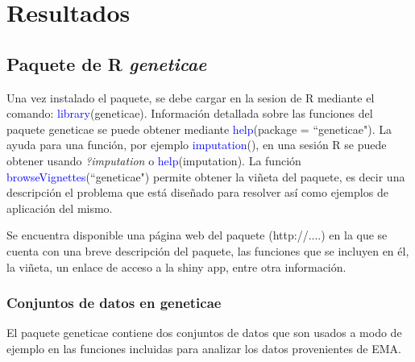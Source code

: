 

\chapter{Resultados}

\section{Paquete de R \emph{geneticae}}

Una vez instalado el paquete, se debe cargar en la sesion de R mediante el comando: \textcolor{blue}{library}(geneticae). Información detallada sobre las funciones del paquete geneticae se puede obtener mediante \textcolor{blue}{help}(package = ``geneticae"). La ayuda para una función, por ejemplo \textcolor{blue}{imputation}(), en una sesión R se puede obtener usando \emph{?imputation} o \textcolor{blue}{help}(imputation). La función \textcolor{blue}{browseVignettes}(``geneticae") permite obtener la viñeta del paquete, es decir una descripción el problema que está diseñado para resolver así como ejemplos de aplicación del mismo. 

Se encuentra disponible una página web del paquete (http://....) en la que se cuenta con una breve descripción del paquete, las funciones que se incluyen en él, la viñeta, un enlace de acceso a la shiny app, entre otra información.


\subsection{Conjuntos de datos en geneticae}

El paquete geneticae contiene dos conjuntos de datos que son usados a modo de ejemplo en las funciones incluidas para analizar los datos provenientes de EMA.

